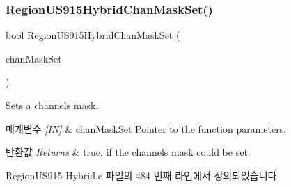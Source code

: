 \subsubsection{\texorpdfstring{Region\+U\+S915\+Hybrid\+Chan\+Mask\+Set()}{RegionUS915HybridChanMaskSet()}}
{\footnotesize\ttfamily bool Region\+U\+S915\+Hybrid\+Chan\+Mask\+Set (\begin{DoxyParamCaption}\item[{\mbox{\hyperlink{group___r_e_g_i_o_n_ga6d24f7da136006410827dfb29f6b9b9e}{Chan\+Mask\+Set\+Params\+\_\+t}} $\ast$}]{chan\+Mask\+Set }\end{DoxyParamCaption})}



Sets a channels mask. 


\begin{DoxyParams}{매개변수}
{\em \mbox{[}\+I\+N\mbox{]}} & chan\+Mask\+Set Pointer to the function parameters.\\
\hline
\end{DoxyParams}

\begin{DoxyRetVals}{반환값}
{\em Returns} & true, if the channels mask could be set. \\
\hline
\end{DoxyRetVals}


Region\+U\+S915-\/\+Hybrid.\+c 파일의 484 번째 라인에서 정의되었습니다.


